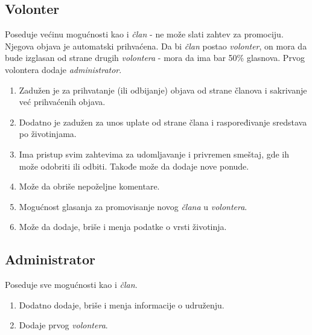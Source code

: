 \subsection{Volonter} 
    \par Poseduje većinu mogućnosti kao i \textit{član} - ne može slati zahtev za promociju. Njegova objava je automatski prihvaćena. 
    Da bi \textit{član} postao \textit{volonter}, on mora da bude izglasan od strane drugih \textit{volontera} - mora da ima bar 50\% glasnova. 
    Prvog volontera dodaje \textit{administrator}. 
    \begin{enumerate}
        \item Zadužen je za prihvatanje (ili odbijanje) objava od strane članova i sakrivanje već prihvaćenih objava.
        \item Dodatno je zadužen za unos uplate od strane člana i raspoređivanje sredstava po životinjama.
        \item Ima pristup svim zahtevima za udomljavanje i privremen smeštaj, gde ih može odobriti ili odbiti. Takođe može da dodaje nove ponude.
        \item Može da obriše nepoželjne komentare.
        \item Mogućnost glasanja za promovisanje novog \textit{člana} u \textit{volontera}.
        \item Može da dodaje, briše i menja podatke o vrsti životinja.
    \end{enumerate}
\subsection{Administrator}
    \par Poseduje sve mogućnosti kao i \textit{član}. 
    \begin{enumerate}
        \item Dodatno dodaje, briše i menja informacije o udruženju. 
        \item Dodaje prvog \textit{volontera}.
    \end{enumerate}
    